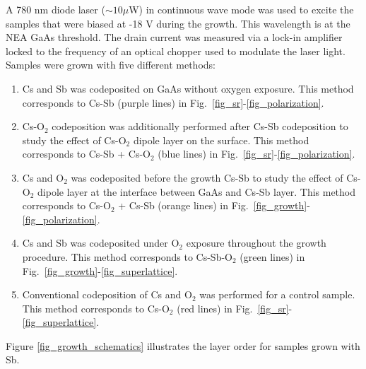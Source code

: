 A 780 nm diode laser ($\sim 10 \mu$W) in continuous wave mode was used to excite the samples \cite{feng2019_activation} that were biased at -18 V during the growth. This wavelength is at the NEA GaAs threshold. The drain current was measured via a lock-in amplifier locked to the frequency of an optical chopper used to modulate the laser light.
Samples were grown with five different methods:
\begin{enumerate}[label=(\alph*)]
	\item Cs and Sb was codeposited on GaAs without oxygen exposure. This method corresponds to Cs-Sb (purple lines) in Fig.~\ref{fig_sr}-\ref{fig_polarization}.
	\item Cs-O$_2$ codeposition was additionally performed after Cs-Sb codeposition to study the effect of Cs-O$_2$ dipole layer on the surface. This method corresponds to Cs-Sb + Cs-O$_2$ (blue lines) in Fig.~\ref{fig_sr}-\ref{fig_polarization}.
	\item Cs and O$_2$ was codeposited before the growth Cs-Sb to study the effect of Cs-O$_2$ dipole layer at the interface between GaAs and Cs-Sb layer. This method corresponds to Cs-O$_2$ + Cs-Sb (orange lines) in Fig.~\ref{fig_growth}-\ref{fig_polarization}.
	\item Cs and Sb was codeposited under O$_2$ exposure throughout the growth procedure. This method corresponds to Cs-Sb-O$_2$ (green lines) in Fig.~\ref{fig_growth}-\ref{fig_superlattice}.
	\item Conventional codeposition of Cs and O$_2$ was performed for a control sample. This method corresponds to Cs-O$_2$ (red lines) in Fig.~\ref{fig_sr}-\ref{fig_superlattice}.
\end{enumerate}
Figure \ref{fig_growth_schematics} illustrates the layer order for samples grown with Sb.

